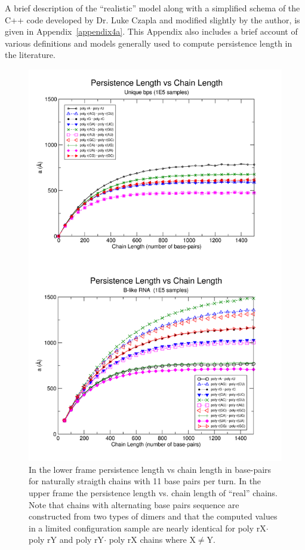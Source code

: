 A brief description of the ``realistic'' model along with a simplified
schema  of the  C++ code  developed by  Dr. Luke  Czapla  and modified
slightly by  the author,  is given in  Appendix~\ref{appendix4a}. This
Appendix  also includes  a brief  account of  various  definitions and
models generally used to compute persistence length in the literature.


\begin{figure}
\centering
\includegraphics[angle=0, scale=2.6]{Chapter4/perVlen.png}
\caption{In  the lower  frame persistence  length vs  chain  length in
  base-pairs  for naturally  straigth chains  with 11  base  pairs per
  turn. In the upper frame  the persistence length vs. chain length of
  ``real''  chains.   Note that  chains  with  alternating base  pairs
  sequence  are constructed  from two  types  of dimers  and that  the
  computed  values  in  a  limited  configuration  sample  are  nearly
  identical  for poly  rX$\cdot$ poly  rY and  poly rY$\cdot$  poly rX
  chains where X$\neq$Y.}
\label{fig:perVlen}
\end{figure}

